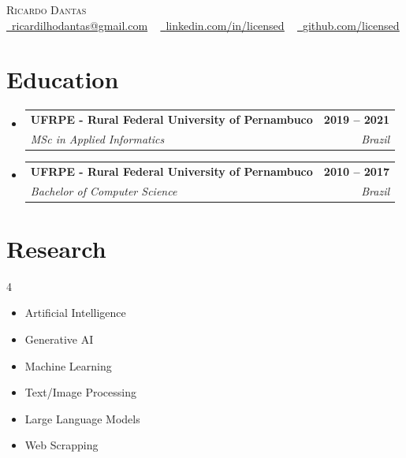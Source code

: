\documentclass[letterpaper,11pt]{article}
\makeatletter
\newcommand{\resumeSubheading}[4]{
  \vspace{-2pt}\item
    \begin{tabular*}{1.0\textwidth}[t]{l@{\extracolsep{\fill}}r}
      \textbf{#1} & \textbf{\small #2} \\
      \textit{\small#3} & \textit{\small #4} \\
    \end{tabular*}\vspace{-7pt}
}
\newcommand{\resumeSubHeadingListStart}{\begin{itemize}[leftmargin=0.0in, label={}]}
\newcommand{\resumeSubHeadingListEnd}{\end{itemize}}
\makeatother
\begin{document}

\begin{center}
    {\Huge \scshape Ricardo Dantas} \\ \vspace{1pt}
    \href{mailto:ricardilhodantas@gmail.com}{\raisebox{-0.2\height}\faEnvelope\  \underline{ricardilhodantas@gmail.com}} ~ 
    \href{https://linkedin.com/in/licensed/}{\raisebox{-0.2\height}\faLinkedin\ \underline{linkedin.com/in/licensed}}  ~
    \href{https://github.com/licensed/}{\raisebox{-0.2\height}\faGithub\ \underline{github.com/licensed}}
    \vspace{-8pt}
\end{center}


\section{Education}
  \resumeSubHeadingListStart
    \resumeSubheading
      {UFRPE - Rural Federal University of Pernambuco}{2019 -- 2021}
      {MSc in Applied Informatics}{Brazil}
    \resumeSubHeadingListEnd

  \resumeSubHeadingListStart
    \resumeSubheading
      {UFRPE - Rural Federal University of Pernambuco} {2010 -- 2017}
      {Bachelor of Computer Science} {Brazil}
    \resumeSubHeadingListEnd
\section{Research}
        \begin{multicols}{4}
            \begin{itemize}[itemsep=-5pt, parsep=3pt]
                \item\small Artificial Intelligence
                \item Generative AI
                \item Machine Learning
                \item Text/Image Processing
                \item Large Language Models
                \item Web Scrapping
            \end{itemize}
        \end{multicols}
        \vspace*{2.0\multicolsep}
\end{document}
